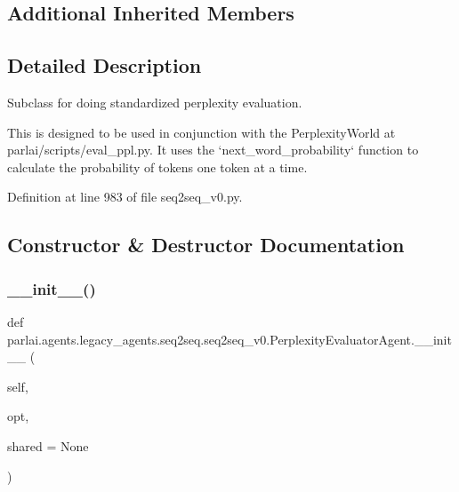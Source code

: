 \subsection*{Additional Inherited Members}


\subsection{Detailed Description}
\begin{DoxyVerb}Subclass for doing standardized perplexity evaluation.

This is designed to be used in conjunction with the PerplexityWorld at
parlai/scripts/eval_ppl.py. It uses the `next_word_probability` function to
calculate the probability of tokens one token at a time.
\end{DoxyVerb}
 

Definition at line 983 of file seq2seq\+\_\+v0.\+py.



\subsection{Constructor \& Destructor Documentation}
\mbox{\label{classparlai_1_1agents_1_1legacy__agents_1_1seq2seq_1_1seq2seq__v0_1_1PerplexityEvaluatorAgent_a6d6f4af5d475bea076503cd83c5ce502}} 
\subsubsection{\texorpdfstring{\+\_\+\+\_\+init\+\_\+\+\_\+()}{\_\_init\_\_()}}
{\footnotesize\ttfamily def parlai.\+agents.\+legacy\+\_\+agents.\+seq2seq.\+seq2seq\+\_\+v0.\+Perplexity\+Evaluator\+Agent.\+\_\+\+\_\+init\+\_\+\+\_\+ (\begin{DoxyParamCaption}\item[{}]{self,  }\item[{}]{opt,  }\item[{}]{shared = {\ttfamily None} }\end{DoxyParamCaption})}



